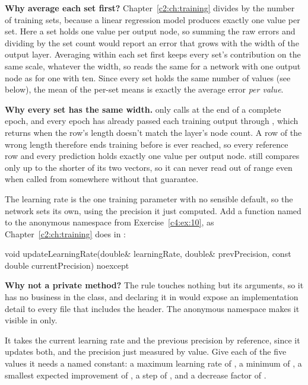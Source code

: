 \textbf{Why average each set first?} Chapter~\ref{c2:ch:training} divides by the number of training
sets, because a linear regression model produces exactly one value per set. Here a set holds one
value per output node, so summing the raw errors and dividing by the set count would report an
error that grows with the width of the output layer. Averaging within each set first keeps every
set's contribution on the same scale, whatever the width, so  reads the same for a
network with one output node as for one with ten. Since every set holds the same number of values
(see below), the mean of the per-set means is exactly the average error \emph{per value}.

\textbf{Why every set has the same width.}  only calls  at the end
of a complete epoch, and every epoch has already passed each training output through
, which returns  when the row's length doesn't match
the layer's node count. A row of the wrong length therefore ends training before
 is ever reached, so every reference row and every prediction holds exactly one
value per output node.  still compares only up to the shorter of its two vectors,
so it can never read out of range even when called from somewhere without that guarantee.

\label{c4:ex:11}
The learning rate is the one training parameter with no sensible default, so the network sets its
own, using the precision it just computed. Add a function named  to the
anonymous namespace from Exercise~\ref{c4:ex:10}, as Chapter~\ref{c2:ch:training} does in
:

\begin{cppcode}
void updateLearningRate(double& learningRate, double& prevPrecision,
                        const double currentPrecision) noexcept
\end{cppcode}

\noindent\textbf{Why not a private method?} The rule touches nothing but its arguments, so it has no
business in the class, and declaring it in  would expose an implementation detail
to every file that includes the header. The anonymous namespace makes it visible in
 only.

It takes the current learning rate and the previous precision by reference, since it
updates both, and the precision just measured by value. Give each of the five values it needs a
named constant: a maximum learning rate of , a minimum of , a smallest
expected improvement of , a step of , and a decrease factor of .

